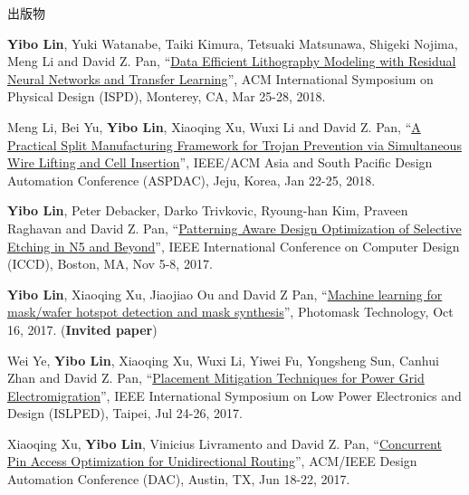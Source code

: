 \begin{rSection}{出版物}
\begin{description}[font=\normalfont]
{}
            

\item[{[C15]}]{
        \textbf{Yibo Lin}, Yuki Watanabe, Taiki Kimura, Tetsuaki Matsunawa, Shigeki Nojima, Meng Li and David Z. Pan, 
    ``\href{https://doi.org/10.1145/3177540.3178242}{Data Efficient Lithography Modeling with Residual Neural Networks and Transfer Learning}'', 
    ACM International Symposium on Physical Design (ISPD), Monterey, CA, Mar 25-28, 2018.
    
}
            

\item[{[C14]}]{
        Meng Li, Bei Yu, \textbf{Yibo Lin}, Xiaoqing Xu, Wuxi Li and David Z. Pan, 
    ``\href{https://doi.org/10.1109/ASPDAC.2018.8297316}{A Practical Split Manufacturing Framework for Trojan Prevention via Simultaneous Wire Lifting and Cell Insertion}'', 
    IEEE/ACM Asia and South Pacific Design Automation Conference (ASPDAC), Jeju, Korea, Jan 22-25, 2018.
    
}
            

\item[{[C13]}]{
        \textbf{Yibo Lin}, Peter Debacker, Darko Trivkovic, Ryoung-han Kim, Praveen Raghavan and David Z. Pan, 
    ``\href{https://doi.org/10.1109/ICCD.2017.72}{Patterning Aware Design Optimization of Selective Etching in N5 and Beyond}'', 
    IEEE International Conference on Computer Design (ICCD), Boston, MA, Nov 5-8, 2017.
    
}
            

\item[{[C12]}]{
        \textbf{Yibo Lin}, Xiaoqing Xu, Jiaojiao Ou and David Z Pan, 
    ``\href{http://dx.doi.org/10.1117/12.2282943}{Machine learning for mask/wafer hotspot detection and mask synthesis}'', 
    Photomask Technology, Oct 16, 2017.
    (\textbf{Invited paper})
}
            

\item[{[C11]}]{
        Wei Ye, \textbf{Yibo Lin}, Xiaoqing Xu, Wuxi Li, Yiwei Fu, Yongsheng Sun, Canhui Zhan and David Z. Pan, 
    ``\href{https://doi.org/10.1109/ISLPED.2017.8009178}{Placement Mitigation Techniques for Power Grid Electromigration}'', 
    IEEE International Symposium on Low Power Electronics and Design (ISLPED), Taipei, Jul 24-26, 2017.
    
}
            

\item[{[C10]}]{
        Xiaoqing Xu, \textbf{Yibo Lin}, Vinicius Livramento and David Z. Pan, 
    ``\href{https://doi.org/10.1145/3061639.3062214}{Concurrent Pin Access Optimization for Unidirectional Routing}'', 
    ACM/IEEE Design Automation Conference (DAC), Austin, TX, Jun 18-22, 2017.
    
}
\end{description}
\end{rSection}
